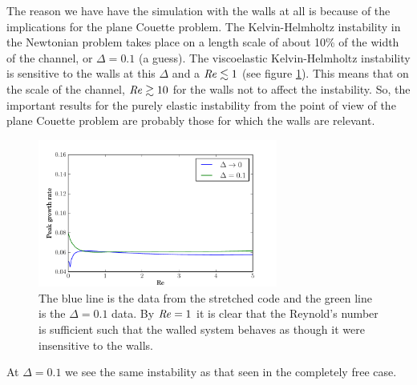 \documentclass{jfm}
\newcommand\Rey{\mbox{\textit{Re}}}  %
\begin{document}
The reason we have have the simulation with the walls at all is because of the implications for the plane Couette problem. The Kelvin-Helmholtz instability in the Newtonian problem takes place on a length scale of about 10\% of the width of the channel, or $\Delta = 0.1$ (a guess). The viscoelastic Kelvin-Helmholtz instability is sensitive to the walls at this $\Delta$ and a $\Rey \lesssim 1$ (see figure \ref{fig:vary_Re_delta_conv}). This means that on the scale of the channel, $\Rey \gtrsim 10$ for the walls not to affect the instability. So, the important results for the purely elastic instability from the point of view of the plane Couette problem are probably those for which the walls are relevant. 

\begin{figure}
    \centering
    \includegraphics[width=0.7\textwidth]{vary_Re_delta_conv}
    \caption{The blue line is the data from the stretched code and the green line is the $\Delta = 0.1$ data. By $\Rey = 1$ it is clear that the Reynold's number is sufficient such that the walled system behaves as though it were insensitive to the walls.}
    \label{fig:vary_Re_delta_conv}
\end{figure}

At $\Delta = 0.1$ we see the same instability as that seen in the completely free case. 
\end{document}
